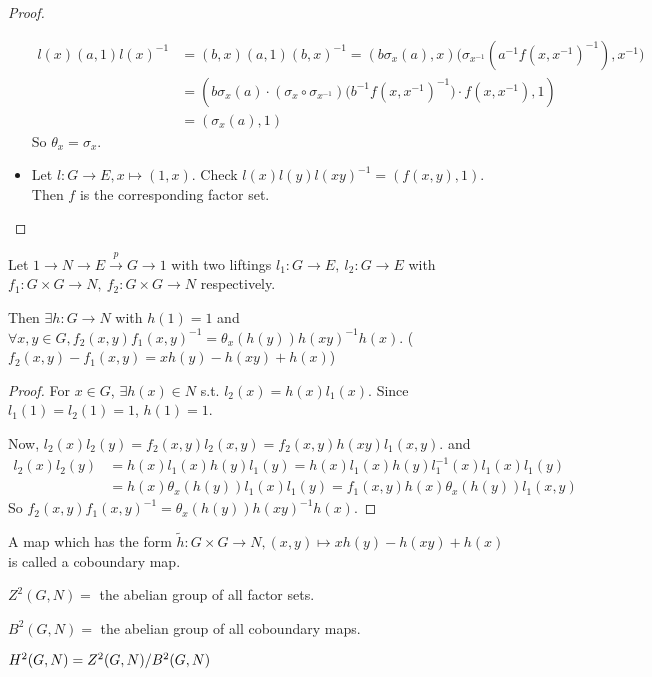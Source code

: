 \begin{theorem}
\begin{proof}
\begin{itemize}
        \begin{align*}
          l(x)(a, 1)l(x)^{-1}
          &= (b, x) (a, 1) (b, x)^{-1} = (b \sigma_x(a) , x)
          \big(\sigma_{x^{-1}}(a^{-1}f(x,x^{-1})^{-1}), x^{-1} \big) \\
          &= (b \sigma_{x}(a) \cdot (\sigma_x \circ \sigma_{x^{-1}}) \big( b^{-1} f(x, x^{-1})^{-1} \big)
          \cdot f(x, x^{-1}), 1) \\
          &= (\sigma_x(a), 1)
        \end{align*}
        So $\theta_{x} = \sigma_{x}$.
      \item Let $l: G\to E, x\mapsto (1, x)$.
        Check $l(x)l(y)l(xy)^{-1} = (f(x,y), 1)$.
        Then $f$ is the corresponding factor set.
        \qedhere
    \end{itemize}
  \end{proof}
\end{theorem}

\begin{prop}
  Let $1\to N\to E \xrightarrow{p}G \to 1$ with two liftings
  $l_1: G \to E,\ l_2: G\to E$ with $f_1: G\times G\to N,\ f_2: G\times G\to N$
  respectively.

  Then $\exists h: G\to N$ with $h(1) = 1$ and $\forall x,y\in G,
  f_2(x, y)f_1(x,y)^{-1} = \theta_{x}(h(y))h(xy)^{-1}h(x)$. 
  ($f_2(x,y) - f_1(x,y) = xh(y) - h(xy) + h(x)$)

  \begin{proof}
    For $x\in G$, $\exists h(x) \in N$ s.t.
    $l_2(x) = h(x)l_1(x)$.
    Since $l_1(1) = l_2(1) = 1$, $h(1) = 1$.

    Now, $l_2(x)l_2(y) = f_2(x, y) l_2(x, y) = f_2(x, y) h(xy) l_1(x, y)$. and
    \begin{align*}
      l_2(x) l_2(y) &= h(x) l_1(x) h(y) l_1(y) = h(x) l_1(x) h(y) l_1^{-1}(x) l_1(x) l_1(y) \\
      &= h(x) \theta_x(h(y)) l_1(x) l_1(y) = f_1(x, y) h(x) \theta_x(h(y)) l_1(x, y)
    \end{align*}
    So $f_2(x, y) f_1(x, y)^{-1} = \theta_x(h(y)) h(xy)^{-1} h(x)$.
  \end{proof}
\end{prop}

\begin{remark}
  A map which has the form $\tilde{h}: G\times G \to N, (x,y) \mapsto
  xh(y) - h(xy) + h(x)$ is called a coboundary map.
\end{remark}

\begin{definition}
  $Z^2(G, N) =$ the abelian group of all factor sets.

  $B^2(G, N) =$ the abelian group of all coboundary maps.

  $H^2(G, N) = {Z^2(G, N)}/{B^2(G, N)}$
\end{definition}

